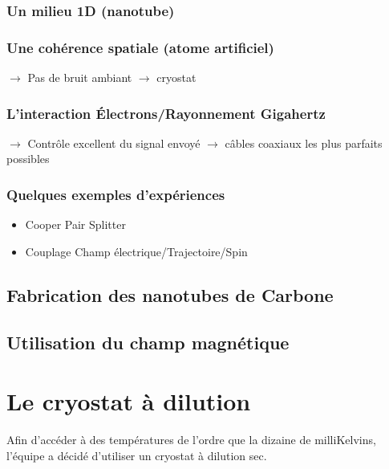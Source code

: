 \documentclass[a4paper,11pt]{report}
\begin{document}
\subsection{Un milieu 1D (nanotube)}

\subsection{Une cohérence spatiale (atome artificiel)}
$\rightarrow$ Pas de bruit ambiant $\rightarrow$ cryostat

\subsection{L'interaction Électrons/Rayonnement Gigahertz}
$\rightarrow$ Contrôle excellent du signal envoyé $\rightarrow$ câbles coaxiaux les plus parfaits possibles

\subsection{Quelques exemples d'expériences}
\begin{itemize}
    \item Cooper Pair Splitter
    \item Couplage Champ électrique/Trajectoire/Spin
\end{itemize}

\section{Fabrication des nanotubes de Carbone}

\section{Utilisation du champ magnétique}

\chapter{Le cryostat à dilution}
Afin d'accéder à des températures de l'ordre que la dizaine de milliKelvins, l'équipe a décidé d'utiliser un cryostat à dilution sec.
\end{document}
